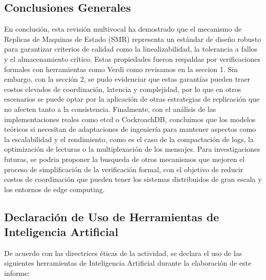 \documentclass[12pt,letterpaper]{article}
\begin{document}
\subsection{Conclusiones Generales}
En conclusión, esta revisión multivocal ha demostrado que el mecanismo de Replicas de Maquinas de Estado (SMR) representa un estándar de diseño robusto para garantizar criterios de calidad como la linealizabilidad, la tolerancia a fallos y el almacenamiento crítico. Estas propiedades fueron respaldas por verificaciones formales con herramientas como Verdi como revisamos en la seccion 1. Sin embargo, con la sección 2, se pudo evidenciar que estas garantías pueden traer costos elevados de coordinación, latencia y complejidad, por lo que en otros escenarios se puede optar por la aplicación de otras estrategias de replicación que no afecten tanto a la consistencia. Finalmente, con el análisis de las implementaciones reales como etcd o CockroachDB, concluimos que los modelos teóricos si necesitan de adaptaciones de ingeniería para mantener aspectos como la escalabilidad y el rendimiento, como es el caso de la compactación de logs, la optimización de lecturas o la multiplexación de los mensajes. Para investigaciones futuras, se podria proponer la busqueda de otros mecanismos que mejoren el proceso de simplificación de la verificación formal, con el objetivo de reducir costos de coordinación que pueden tener los sistemas distribuidos de gran escala y los entornos de edge computing.

\subsection{Declaración de Uso de Herramientas de Inteligencia Artificial}
De acuerdo con las directrices éticas de la actividad, se declara el uso de las siguientes herramientas de Inteligencia Artificial durante la elaboración de este informe:
\end{document}
